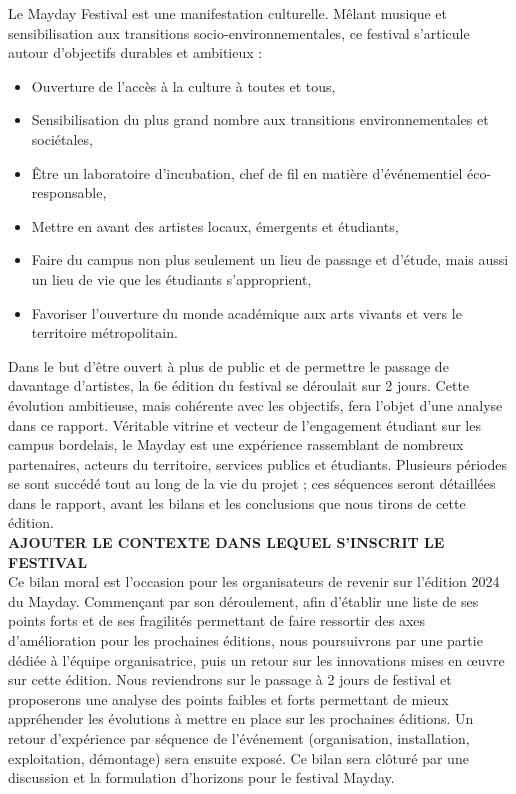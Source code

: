 \documentclass[12pt,a4paper]{report}
\begin{document}
Le Mayday Festival est une manifestation culturelle. Mêlant musique et sensibilisation aux transitions socio-environnementales, ce festival s'articule autour d'objectifs durables et ambitieux :
\begin{itemize}
\item Ouverture de l’accès à la culture à toutes et tous,
\item Sensibilisation du plus grand nombre aux transitions environnementales et sociétales,
\item Être un laboratoire d’incubation, chef de fil en matière d’événementiel éco-responsable,
\item Mettre en avant des artistes locaux, émergents et étudiants,
\item Faire du campus non plus seulement un lieu de passage et d'étude, mais aussi un lieu de vie que les étudiants s'approprient,
\item Favoriser l’ouverture du monde académique aux arts vivants et vers le territoire métropolitain.\\
\end{itemize}

Dans le but d’être ouvert à plus de public et de permettre le passage de davantage d’artistes, la 6e édition du festival se déroulait sur 2 jours. Cette évolution ambitieuse, mais cohérente avec les objectifs, fera l’objet d’une analyse dans ce rapport. Véritable vitrine et vecteur de l'engagement étudiant sur les campus bordelais, le Mayday est une expérience rassemblant de nombreux partenaires, acteurs du territoire, services publics et étudiants. Plusieurs périodes se sont succédé tout au long de la vie du projet ; ces séquences seront détaillées dans le rapport, avant les bilans et les conclusions que nous tirons de cette édition.\\

\textbf{AJOUTER LE CONTEXTE DANS LEQUEL S'INSCRIT LE FESTIVAL}\\

Ce bilan moral est l’occasion pour les organisateurs de revenir sur l’édition 2024 du Mayday. Commençant par son déroulement, afin d’établir une liste de ses points forts et de ses fragilités permettant de faire ressortir des axes d’amélioration pour les prochaines éditions, nous poursuivrons par une partie dédiée à l'équipe organisatrice, puis un retour sur les innovations mises en œuvre sur cette édition. Nous reviendrons sur le passage à 2 jours de festival et proposerons une analyse des points faibles et forts permettant de mieux appréhender les évolutions à mettre en place sur les prochaines éditions. Un retour d'expérience par séquence de l'événement (organisation, installation, exploitation, démontage) sera ensuite exposé. Ce bilan sera clôturé par une discussion et la formulation d'horizons pour le festival Mayday.
\end{document}
